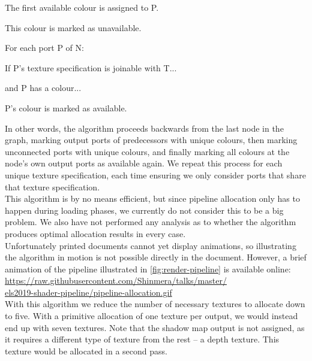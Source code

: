 \documentclass[format=sigconf]{acmart}
\begin{document}
\begin{step}
\begin{step}
\begin{step}
\begin{step}
      \item The first available colour is assigned to P.
      \item This colour is marked as unavailable.
      \end{step}
    \item For each port P of N:
      \begin{step}
      \item If P's texture specification is joinable with T...
      \item and P has a colour...
      \item P's colour is marked as available.
      \end{step}
    \end{step}
  \end{step}
\end{step}

In other words, the algorithm proceeds backwards from the last node in the graph, marking output ports of predecessors with unique colours, then marking unconnected ports with unique colours, and finally marking all colours at the node's own output ports as available again. We repeat this process for each unique texture specification, each time ensuring we only consider ports that share that texture specification. \\

This algorithm is by no means efficient, but since pipeline allocation only has to happen during loading phases, we currently do not consider this to be a big problem. We also have not performed any analysis as to whether the algorithm produces optimal allocation results in every case.\\

Unfortunately printed documents cannot yet display animations, so illustrating the algorithm in motion is not possible directly in the document. However, a brief animation of the pipeline illustrated in \autoref{fig:render-pipeline} is available online: \\

\href{https://raw.githubusercontent.com/Shinmera/talks/master/els2019-shader-pipeline/pipeline-allocation.gif}{https://raw.githubusercontent.com/Shinmera/talks/master/\\els2019-shader-pipeline/pipeline-allocation.gif} \\

With this algorithm we reduce the number of necessary textures to allocate down to five. With a primitive allocation of one texture per output, we would instead end up with seven textures. Note that the shadow map output is not assigned, as it requires a different type of texture from the rest -- a depth texture. This texture would be allocated in a second pass.
\end{document}
